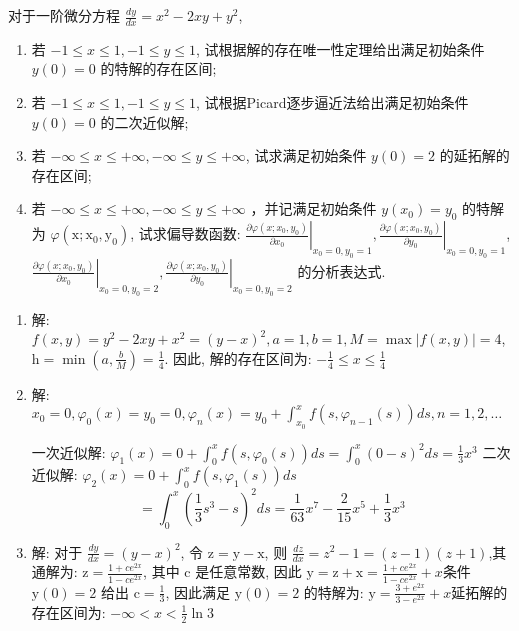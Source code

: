 \begin{exercise}
    对于一阶微分方程 $\frac{d y}{d x}=x^2-2 x y+y^2$,
    \begin{enumerate}
        \item 若 $-1 \leq x \leq 1,-1 \leq y \leq 1$, 试根据解的存在唯一性定理给出满足初始条件 $y(0)=0$ 的特解的存在区间;
        \item 若 $-1 \leq x \leq 1,-1 \leq y \leq 1$, 试根据Picard逐步逼近法给出满足初始条件 $y(0)=0$ 的二次近似解;
        \item 若 $-\infty \leq x \leq+\infty,-\infty \leq y \leq+\infty$, 试求满足初始条件 $y(0)=2$ 的延拓解的存在区间;
        \item 若 $-\infty \leq x \leq+\infty,-\infty \leq y \leq+\infty$ ，并记满足初始条件 $y\left(x_0\right)=y_0$ 的特解为 $\varphi\left(\mathrm{x} ; \mathrm{x}_0, \mathrm{y}_0\right)$, 试求偏导数函数: $\left.\frac{\partial \varphi\left(x ; x_0, y_0\right)}{\partial x_0}\right|_{x_0=0, y_0=1},\left.\frac{\partial \varphi\left(x ; x_0, y_0\right)}{\partial y_0}\right|_{x_0=0, y_0=1}$, $\left.\frac{\partial \varphi\left(x ; x_0, y_0\right)}{\partial x_0}\right|_{x_0=0, y_0=2},\left.\frac{\partial \varphi\left(x ; x_0, y_0\right)}{\partial y_0}\right|_{x_0=0, y_0=2}$ 的分析表达式.
    \end{enumerate}
\end{exercise}
\begin{solution}
    \begin{enumerate}
        \item 解: $f(x, y)=y^2-2 x y+x^2=(y-x)^2, a=1, b=1, M=\max |f(x, y)|=4$, $\mathrm{h}=\min \left(a, \frac{b}{M}\right)=\frac{1}{4}$. 因此, 解的存在区间为: $-\frac{1}{4} \leq x \leq \frac{1}{4}$
        \item 解: $x_0=0, \varphi_0(x)=y_0=0, \varphi_n(x)=y_0+\int_{x_0}^x f\left(s, \varphi_{n-1}(s)\right) d s, n=1,2, \ldots$

              一次近似解: $\varphi_1(x)=0+\int_0^x f\left(s, \varphi_0(s)\right) d s=\int_0^x(0-s)^2 d s=\frac{1}{3} x^3$
              二次近似解: $\varphi_2(x)=0+\int_0^x f\left(s, \varphi_1(s)\right) d s$
              $$
                  =\int_0^x\left(\frac{1}{3} s^3-s\right)^2 d s=\frac{1}{63} x^7-\frac{2}{15} x^5+\frac{1}{3} x^3
              $$
        \item 解: 对于 $\frac{d y}{d x}=(y-x)^2$, 令 $\mathrm{z}=\mathrm{y}-\mathrm{x}$, 则 $\frac{d z}{d x}=z^2-1=(z-1)(z+1)$,其通解为: $\mathrm{z}=\frac{1+c e^{2 x}}{1-c e^{2 x}}$, 其中 c 是任意常数, 因此 $\mathrm{y}=\mathrm{z}+\mathrm{x}=\frac{1+c e^{2 x}}{1-c e^{2 x}}+x$条件 $\mathrm{y}(0)=2$ 给出 $\mathrm{c}=\frac{1}{3}$, 因此满足 $\mathrm{y}(0)=2$ 的特解为: $\mathrm{y}=\frac{3+e^{2 x}}{3-e^{2 x}}+x$延拓解的存在区间为: $-\infty<x<\frac{1}{2} \ln 3$
    \end{enumerate}
\end{solution}

